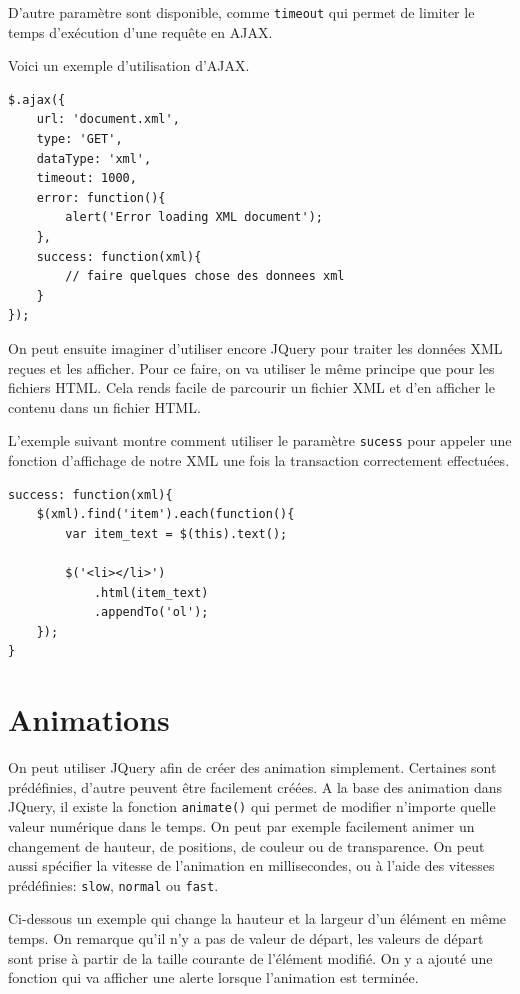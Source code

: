 \documentclass[10pt,a4paper,titlepage]{article}
\begin{document}
D'autre paramètre sont disponible, comme \texttt{timeout} qui permet de limiter le temps d'exécution d'une requête en AJAX.

Voici un exemple d'utilisation d'AJAX. 

\begin{lstlisting}
$.ajax({
    url: 'document.xml',
    type: 'GET',
    dataType: 'xml',
    timeout: 1000,
    error: function(){
        alert('Error loading XML document');
    },
    success: function(xml){
        // faire quelques chose des donnees xml
    }
});
\end{lstlisting}

On peut ensuite imaginer d'utiliser encore JQuery pour traiter les données XML reçues et les afficher. Pour ce faire, on va utiliser le même principe que pour les fichiers HTML. Cela rends facile de parcourir un fichier XML et d'en afficher le contenu dans un fichier HTML.

L'exemple suivant montre comment utiliser le paramètre \texttt{sucess} pour appeler une fonction d'affichage de notre XML une fois la transaction correctement effectuées.

\begin{lstlisting}
success: function(xml){
    $(xml).find('item').each(function(){
        var item_text = $(this).text();

        $('<li></li>')
            .html(item_text)
            .appendTo('ol');
    });
}
\end{lstlisting}

\newpage
\section{Animations}

On peut utiliser JQuery afin de créer des animation simplement. Certaines sont prédéfinies, d'autre peuvent être facilement créées. A la base des animation dans JQuery, il existe la fonction \texttt{animate()} qui permet de modifier n'importe quelle valeur numérique dans le temps. On peut par exemple facilement animer un changement de hauteur, de positions, de couleur ou de transparence. On peut aussi spécifier la vitesse de l'animation en millisecondes, ou à l'aide des vitesses prédéfinies: \texttt{slow}, \texttt{normal} ou \texttt{fast}.

Ci-dessous un exemple qui change la hauteur et la largeur d'un élément en même temps. On remarque qu'il n'y a pas de valeur de départ, les valeurs de départ sont prise à partir de la taille courante de l'élément modifié. On y a ajouté une fonction qui va afficher une alerte lorsque l'animation est terminée.
\end{document}
